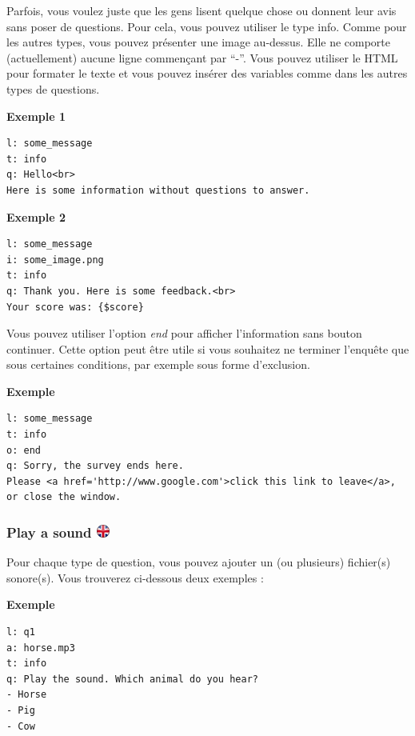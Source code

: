 \documentclass[
]{book}
\begin{document}
Parfois, vous voulez juste que les gens lisent quelque chose ou donnent
leur avis sans poser de questions. Pour cela, vous pouvez utiliser le
type info. Comme pour les autres types, vous pouvez présenter une image
au-dessus. Elle ne comporte (actuellement) aucune ligne commençant par
``-''. Vous pouvez utiliser le HTML pour formater le texte et vous
pouvez insérer des variables comme dans les autres types de questions.

\textbf{Exemple 1}

\begin{verbatim}
l: some_message
t: info
q: Hello<br>
Here is some information without questions to answer.
\end{verbatim}

\textbf{Exemple 2}

\begin{verbatim}
l: some_message
i: some_image.png
t: info
q: Thank you. Here is some feedback.<br>
Your score was: {$score}
\end{verbatim}

Vous pouvez utiliser l'option \emph{end} pour afficher l'information
sans bouton continuer. Cette option peut être utile si vous souhaitez ne
terminer l'enquête que sous certaines conditions, par exemple sous forme
d'exclusion.

\textbf{Exemple}

\begin{verbatim}
l: some_message
t: info
o: end
q: Sorry, the survey ends here.
Please <a href='http://www.google.com'>click this link to leave</a>, or close the window.
\end{verbatim}

\hypertarget{play-a-sound-ukflag}{%
\subsubsection[Play a sound ]{\texorpdfstring{Play a sound
\href{https://www.psytoolkit.org/doc3.1.0/online-survey-syntax.html\#sound}{\protect\includegraphics{img/ukflag.png}}}{Play a sound ukflag}}\label{play-a-sound-ukflag}}

Pour chaque type de question, vous pouvez ajouter un (ou plusieurs)
fichier(s) sonore(s). Vous trouverez ci-dessous deux exemples :

\textbf{Exemple}

\begin{verbatim}
l: q1
a: horse.mp3
t: info
q: Play the sound. Which animal do you hear?
- Horse
- Pig
- Cow
\end{verbatim}
\end{document}

